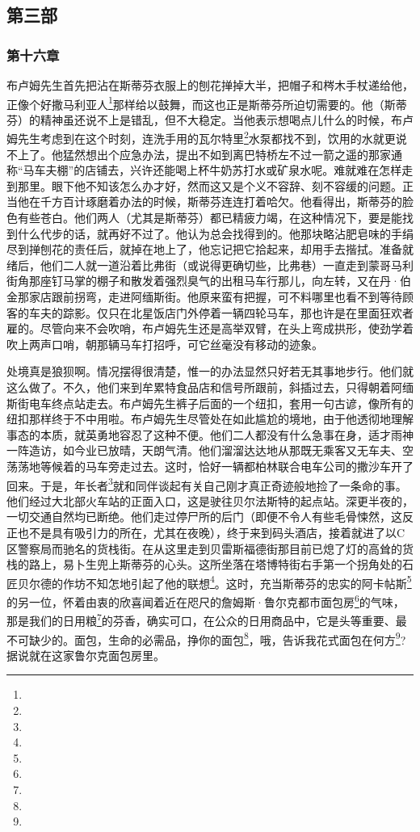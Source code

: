 \subsection*{第三部}





\subsubsection*{第十六章}

\par 布卢姆先生首先把沾在斯蒂芬衣服上的刨花掸掉大半，把帽子和梣木手杖递给他，正像个好撒马利亚人\footnote{}那样给以鼓舞，而这也正是斯蒂芬所迫切需要的。他（斯蒂芬）的精神虽还说不上是错乱，但不大稳定。当他表示想喝点儿什么的时候，布卢姆先生考虑到在这个时刻，连洗手用的瓦尔特里\footnote{}水泵都找不到，饮用的水就更说不上了。他猛然想出个应急办法，提出不如到离巴特桥左不过一箭之遥的那家通称“马车夫棚”的店铺去，兴许还能喝上杯牛奶苏打水或矿泉水呢。难就难在怎样走到那里。眼下他不知该怎么办才好，然而这又是个义不容辞、刻不容缓的问题。正当他在千方百计琢磨着办法的时候，斯蒂芬连连打着哈欠。他看得出，斯蒂芬的脸色有些苍白。他们两人（尤其是斯蒂芬）都已精疲力竭，在这种情况下，要是能找到什么代步的话，就再好不过了。他认为总会找得到的。他那块略沾肥皂味的手绢尽到掸刨花的责任后，就掉在地上了，他忘记把它拾起来，却用手去揩拭。准备就绪后，他们二人就一道沿着比弗街（或说得更确切些，比弗巷）一直走到蒙哥马利街角那座钉马掌的棚子和散发着强烈臭气的出租马车行那儿，向左转，又在丹·伯金那家店跟前拐弯，走进阿缅斯街。他原来蛮有把握，可不料哪里也看不到等待顾客的车夫的踪影。仅只在北星饭店门外停着一辆四轮马车，那也许是在里面狂欢者雇的。尽管向来不会吹哨，布卢姆先生还是高举双臂，在头上弯成拱形，使劲学着吹上两声口哨，朝那辆马车打招呼，可它丝毫没有移动的迹象。
\par 处境真是狼狈啊。情况摆得很清楚，惟一的办法显然只好若无其事地步行。他们就这么做了。不久，他们来到牟累特食品店和信号所跟前，斜插过去，只得朝着阿缅斯街电车终点站走去。布卢姆先生裤子后面的一个纽扣，套用一句古谚，像所有的纽扣那样终于不中用啦。布卢姆先生尽管处在如此尴尬的境地，由于他透彻地理解事态的本质，就英勇地容忍了这种不便。他们二人都没有什么急事在身，适才雨神一阵造访，如今业已放晴，天朗气清。他们溜溜达达地从那既无乘客又无车夫、空荡荡地等候着的马车旁走过去。这时，恰好一辆都柏林联合电车公司的撒沙车开了回来。于是，年长者\footnote{}就和同伴谈起有关自己刚才真正奇迹般地捡了一条命的事。他们经过大北部火车站的正面入口，这是驶往贝尔法斯特的起点站。深更半夜的，一切交通自然均已断绝。他们走过停尸所的后门（即便不令人有些毛骨悚然，这反正也不是具有吸引力的所在，尤其在夜晚），终于来到码头酒店，接着就进了以C区警察局而驰名的货栈街。在从这里走到贝雷斯福德街那目前已熄了灯的高耸的货栈的路上，易卜生兜上斯蒂芬的心头。这所坐落在塔博特街右手第一个拐角处的石匠贝尔德的作坊不知怎地引起了他的联想\footnote{}。这时，充当斯蒂芬的忠实的阿卡帖斯\footnote{}的另一位，怀着由衷的欣喜闻着近在咫尺的詹姆斯·鲁尔克都市面包房\footnote{}的气味，那是我们的日用粮\footnote{}的芬香，确实可口，在公众的日用商品中，它是头等重要、最不可缺少的。面包，生命的必需品，挣你的面包\footnote{}，哦，告诉我花式面包在何方\footnote{}?据说就在这家鲁尔克面包房里。
